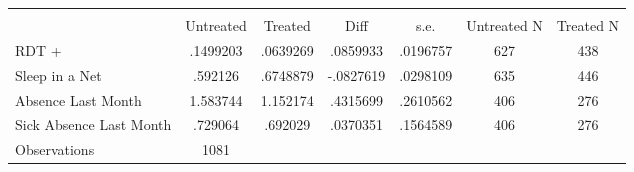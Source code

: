 {
\def\sym#1{\ifmmode^{#1}\else\(^{#1}\)\fi}
\begin{tabular}{l*{1}{cccccc}}
\hline\hline
                    &\multicolumn{6}{c}{}                                                         \\
                    &   Untreated&     Treated&        Diff&        s.e.& Untreated N&   Treated N\\
\hline
RDT +               &    .1499203&    .0639269&    .0859933&    .0196757&         627&         438\\
Sleep in a Net      &     .592126&    .6748879&   -.0827619&    .0298109&         635&         446\\
Absence  Last Month &    1.583744&    1.152174&    .4315699&    .2610562&         406&         276\\
Sick Absence Last Month&     .729064&     .692029&    .0370351&    .1564589&         406&         276\\
\hline
Observations        &        1081&            &            &            &            &            \\
\hline\hline
\end{tabular}
}
